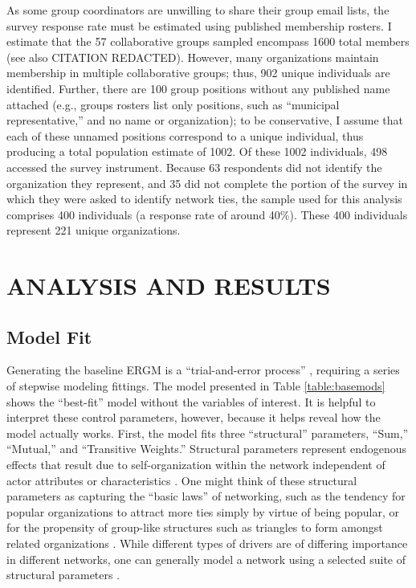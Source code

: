 \documentclass[12pt,a4paper,titlepage]{article}
\begin{document}
As some group coordinators are unwilling to share their group email lists, the survey response rate must be estimated using published membership rosters. I estimate that the 57 collaborative groups sampled encompass 1600 total members (see also CITATION REDACTED). However, many organizations maintain membership in multiple collaborative groups; thus, 902 unique individuals are identified. Further, there are 100 group positions without any published name attached (e.g., groups rosters list only positions, such as “municipal representative,'' and no name or organization); to be conservative, I assume that each of these unnamed positions correspond to a unique individual, thus producing a total population estimate of 1002. Of these 1002 individuals, 498 accessed the survey instrument. Because 63 respondents did not identify the organization they represent, and 35 did not complete the portion of the survey in which they were asked to identify network ties, the sample used for this analysis comprises 400 individuals (a response rate of around 40\%). These 400 individuals represent 221 unique organizations.


\section{\bf\MakeUppercase{Analysis and Results}}

\subsection{Model Fit}

Generating the baseline ERGM is a “trial-and-error process” \parencite[184]{lusher2013-a}, requiring a series of stepwise modeling fittings. The model presented in Table \ref{table:basemods} shows the “best-fit” model without the variables of interest. It is helpful to interpret these control parameters, however, because it helps reveal how the model actually works. First, the model fits three “structural” parameters, “Sum,” “Mutual,” and “Transitive Weights.” Structural parameters represent endogenous effects that result due to self-organization within the network independent of actor attributes or characteristics \parencite{lusher2013-a}. One might think of these structural parameters as capturing the “basic laws” of networking, such as the tendency for popular organizations to attract more ties simply by virtue of being popular, or for the propensity of group-like structures such as triangles to form amongst related organizations \parencite{lusher2013-a}. While different types of drivers are of differing importance in different networks, one can generally model a network using a selected suite of structural parameters \parencite{snijders2006}.
\end{document}
